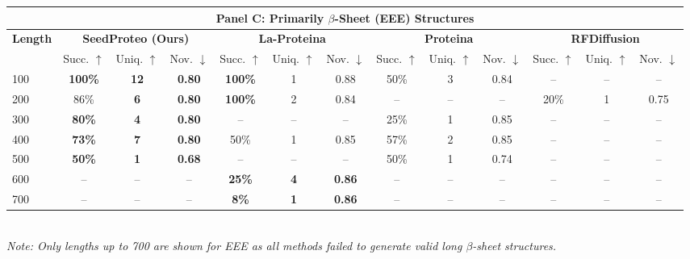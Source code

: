 \documentclass[]{bytedance_seed}
\begin{document}
\begin{table}[p]
{\begin{tabular}{l | ccc | ccc | ccc | ccc}
        \midrule
        \multicolumn{13}{c}{\large \textbf{Panel C: Primarily $\beta$-Sheet (EEE) Structures}} \\
        \midrule
        \multirow{2}{*}{\textbf{Length}} & \multicolumn{3}{c|}{\textbf{SeedProteo (Ours)}} & \multicolumn{3}{c|}{\textbf{La-Proteina}} & \multicolumn{3}{c|}{\textbf{Proteina}} & \multicolumn{3}{c}{\textbf{RFDiffusion}} \\
        \cmidrule(lr){2-4} \cmidrule(lr){5-7} \cmidrule(lr){8-10} \cmidrule(lr){11-13}
         & Succ. $\uparrow$ & Uniq. $\uparrow$ & Nov. $\downarrow$ & Succ. $\uparrow$ & Uniq. $\uparrow$ & Nov. $\downarrow$ & Succ. $\uparrow$ & Uniq. $\uparrow$ & Nov. $\downarrow$ & Succ. $\uparrow$ & Uniq. $\uparrow$ & Nov. $\downarrow$ \\
        \midrule
        100 & \textbf{100\%} & \textbf{12} & \textbf{0.80} & \textbf{100\%} & 1 & 0.88 & 50\% & 3 & 0.84 & -- & -- & -- \\
        200 & 86\% & \textbf{6} & \textbf{0.80} & \textbf{100\%} & 2 & 0.84 & -- & -- & -- & 20\% & 1 & 0.75 \\
        300 & \textbf{80\%} & \textbf{4} & \textbf{0.80} & -- & -- & -- & 25\% & 1 & 0.85 & -- & -- & -- \\
        400 & \textbf{73\%} & \textbf{7} & \textbf{0.80} & 50\% & 1 & 0.85 & 57\% & 2 & 0.85 & -- & -- & -- \\
        500 & \textbf{50\%} & \textbf{1} & \textbf{0.68} & -- & -- & -- & 50\% & 1 & 0.74 & -- & -- & -- \\
        600 & -- & -- & -- & \textbf{25\%} & \textbf{4} & \textbf{0.86} & -- & -- & -- & -- & -- & -- \\
        700 & -- & -- & -- & \textbf{8\%} & \textbf{1} & \textbf{0.86} & -- & -- & -- & -- & -- & -- \\
        \bottomrule
    \end{tabular}%
    }
    \vspace{0.5em}
    \\
    \footnotesize{\textit{Note: Only lengths up to 700 are shown for EEE as all methods failed to generate valid long $\beta$-sheet structures.}}
\end{table}

\end{document}
